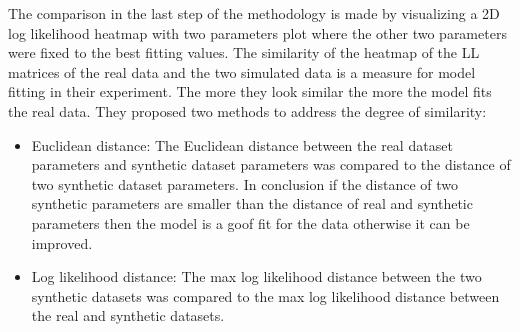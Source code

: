The comparison in the last step of the methodology is made by visualizing  a 2D log likelihood heatmap with two parameters plot where the other two parameters were fixed to the best fitting values. The similarity of the heatmap of the LL matrices of the real data and the two simulated data is a measure for model fitting in their experiment. The more they look similar the more the model fits the real data. They proposed two methods to address the degree of similarity:
\begin{itemize}
\item Euclidean distance: The Euclidean distance between the real dataset parameters and synthetic dataset parameters was compared to the distance of two synthetic dataset parameters. In conclusion if the distance of two synthetic parameters are smaller than the distance of real and synthetic parameters then the model is a goof fit for the data otherwise it can be improved.
\item Log likelihood distance: The max log likelihood distance between the two synthetic datasets was compared to the max log likelihood distance between the real and synthetic datasets. 
\end{itemize}
